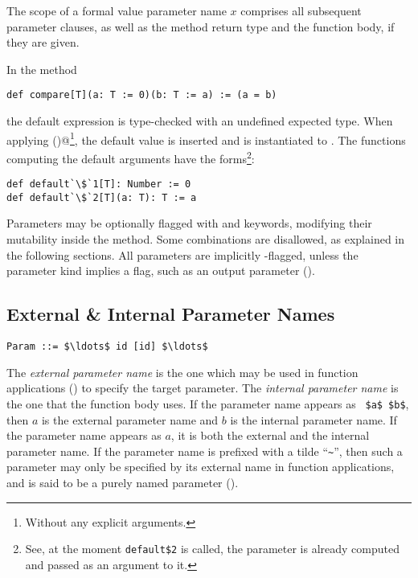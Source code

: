 The scope of a formal value parameter name $x$ comprises all subsequent parameter clauses, as well as the method return type and the function body, if they are given.

\example In the method
\begin{lstlisting}
def compare[T](a: T := 0)(b: T := a) := (a = b)
\end{lstlisting}
the default expression  is type-checked with an undefined expected type. When applying \lstinline@compare()@\footnote{Without any explicit arguments.}, the default value  is inserted and  is instantiated to . The functions computing the default arguments have the forms\footnote{See, at the moment \lstinline[mathescape=false]!default$2! is called, the parameter  is already computed and passed as an argument to it.}:
\begin{lstlisting}[escapechar=`]
def default`\$`1[T]: Number := 0
def default`\$`2[T](a: T): T := a
\end{lstlisting}

Parameters may be optionally flagged with  and  keywords, modifying their mutability inside the method. Some combinations are disallowed, as explained in the following sections. All parameters are implicitly -flagged, unless the parameter kind implies a  flag, such as an output parameter ().





\subsection{External \& Internal Parameter Names}
\label{sec:external-internal-parameter-names}

\syntax\begin{lstlisting}
Param ::= $\ldots$ id [id] $\ldots$
\end{lstlisting}

The {\em external parameter name} is the one which may be used in function applications () to specify the target parameter. The {\em internal parameter name} is the one that the function body uses. If the parameter name appears as ~\lstinline!$a$ $b$!, then $a$ is the external parameter name and $b$ is the internal parameter name. If the parameter name appears as $a$, it is both the external and the internal parameter name. If the parameter name is prefixed with a tilde ``\lstinline!~!'', then such a parameter may only be specified by its external name in function applications, and is said to be a purely named parameter (). 

